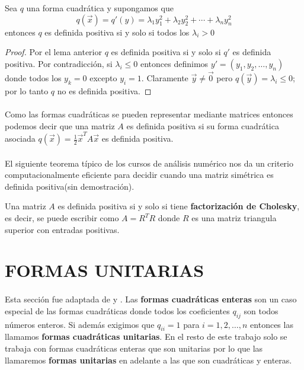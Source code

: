 \begin{theorem}
Sea $q$ una forma cuadrática y supongamos que 
\begin{equation*}
q \left(\overrightarrow{x}\right) = q'(y) = \lambda_{1}y_{1}^{2} + \lambda_{2}y_{2}^{2} + \cdots + \lambda_{n}y_{n}^{2}
\end{equation*}
entonces $q$ es definida positiva si y solo si todos los $\lambda_{i} > 0$
\label{teorema:1.4}
\end{theorem}

\begin{proof}
Por el lema anterior $q$ es definida positiva si y solo si $q'$ es definida positiva. Por contradicción, si $\lambda_{i} \leq 0$ entonces definimos $y' = (y_{1}, y_{2}, \ldots, y_{n})$ donde todos los $y_{k}=0$ excepto $y_{i} = 1$. Claramente $\overrightarrow{y} \neq \overrightarrow{0}$ pero $q(\overrightarrow{y}) = \lambda_{i} \leq 0$; por lo tanto $q$ no es definida positiva.
\end{proof}

\paragraph{}
Como las formas cuadráticas se pueden representar mediante matrices entonces podemos decir que una matriz $A$ es definida positiva si su forma cuadrática asociada $q(\overrightarrow{x}) = \frac{1}{2}\overrightarrow{x}^{T}A\overrightarrow{x}$ es definida positiva.

\paragraph{}
El siguiente teorema típico de los cursos de análisis numérico nos da un criterio computacionalmente eficiente para decidir cuando una matriz simétrica es definida positiva(sin demostración).

\begin{theorem}
Una matriz $A$ es definida positiva si y solo si tiene \textbf{factorización de Cholesky}, es decir, se puede escribir como $A=R^{T}R$ donde $R$ es una matriz triangula superior con entradas positivas.
\label{teorema:1.5}
\end{theorem}

\section{FORMAS UNITARIAS}
\paragraph*{}
Esta sección fue adaptada de \citep{Ringel1985TameAA} y \citep{alma991031505829703276}. Las \textbf{formas cuadráticas enteras} son un caso especial de las formas cuadráticas donde todos los coeficientes $q_{ij}$ son todos números enteros. Si además exigimos que $q_{ii} = 1$ para $i = 1, 2, \ldots, n$ entonces las llamamos \textbf{formas cuadráticas unitarias}. En el resto de este trabajo solo se trabaja con formas cuadráticas enteras que son unitarias por lo que  las llamaremos \textbf{formas unitarias} en adelante a las que son cuadráticas y enteras.

